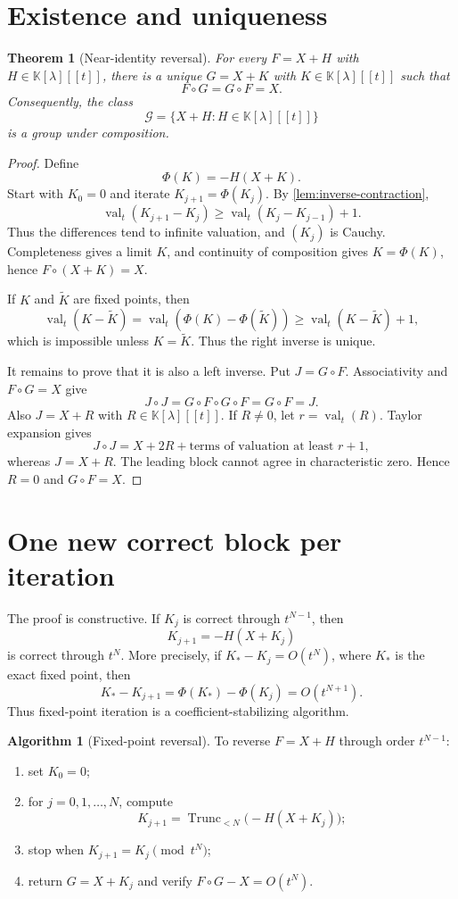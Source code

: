 \documentclass[11pt,openany]{book}
\theoremstyle{definition}
\newtheorem{algorithm}{Algorithm}[chapter]
\theoremstyle{plain}
\newtheorem{theorem}{Theorem}[chapter]
\theoremstyle{remark}
\newcommand{\K}{\mathbb{K}}
\DeclareMathOperator{\val}{val}
\DeclareMathOperator{\trunc}{Trunc}
\begin{document}
\section{Existence and uniqueness}
\begin{theorem}[Near-identity reversal]\label{thm:near-id-inverse}
For every \(F=X+H\) with \(H\in\K[\lambda][[t]]\), there is a unique \(G=X+K\) with \(K\in\K[\lambda][[t]]\) such that
\[
 F\circ G=G\circ F=X.
\]
Consequently, the class
\[
 \mathcal G=\{X+H:H\in\K[\lambda][[t]]\}
\]
is a group under composition.
\end{theorem}

\begin{proof}
Define
\[
 \Phi(K)=-H(X+K).
\]
Start with \(K_0=0\) and iterate \(K_{j+1}=\Phi(K_j)\). By \cref{lem:inverse-contraction},
\[
 \val_t(K_{j+1}-K_j)\ge\val_t(K_j-K_{j-1})+1.
\]
Thus the differences tend to infinite valuation, and \((K_j)\) is Cauchy. Completeness gives a limit \(K\), and continuity of composition gives \(K=\Phi(K)\), hence \(F\circ(X+K)=X\).

If \(K\) and \(\widetilde K\) are fixed points, then
\[
 \val_t(K-\widetilde K)
 =\val_t(\Phi(K)-\Phi(\widetilde K))
 \ge\val_t(K-\widetilde K)+1,
\]
which is impossible unless \(K=\widetilde K\). Thus the right inverse is unique.

It remains to prove that it is also a left inverse. Put \(J=G\circ F\). Associativity and \(F\circ G=X\) give
\[
 J\circ J=G\circ F\circ G\circ F=G\circ F=J.
\]
Also \(J=X+R\) with \(R\in\K[\lambda][[t]]\). If \(R\ne0\), let \(r=\val_t(R)\). Taylor expansion gives
\[
 J\circ J=X+2R+\text{terms of valuation at least }r+1,
\]
whereas \(J=X+R\). The leading block cannot agree in characteristic zero. Hence \(R=0\) and \(G\circ F=X\).
\end{proof}

\section{One new correct block per iteration}
The proof is constructive. If \(K_j\) is correct through \(t^{N-1}\), then
\[
 K_{j+1}=-H(X+K_j)
\]
is correct through \(t^N\). More precisely, if \(K_*-K_j=O(t^N)\), where \(K_*\) is the exact fixed point, then
\[
 K_*-K_{j+1}
 =\Phi(K_*)-\Phi(K_j)=O(t^{N+1}).
\]
Thus fixed-point iteration is a coefficient-stabilizing algorithm.

\begin{algorithm}[Fixed-point reversal]\label{alg:fixed-reversal}
To reverse \(F=X+H\) through order \(t^{N-1}\):
\begin{enumerate}
\item set \(K_0=0\);
\item for \(j=0,1,\ldots,N\), compute
\[
 K_{j+1}=\trunc_{<N}\bigl(-H(X+K_j)\bigr);
\]
\item stop when \(K_{j+1}=K_j\pmod{t^N}\);
\item return \(G=X+K_j\) and verify \(F\circ G-X=O(t^N)\).
\end{enumerate}
\end{algorithm}
\end{document}
